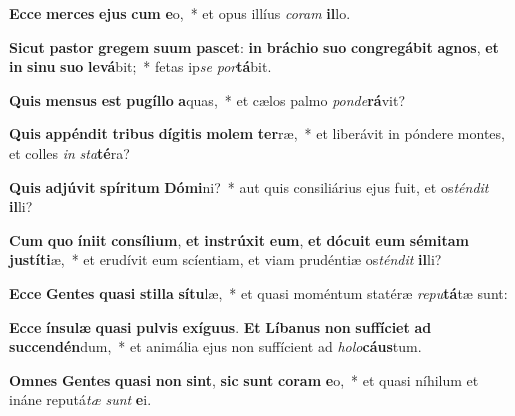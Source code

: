 \item \textbf{Ec}\textbf{ce} \textbf{mer}\textbf{ces} \textbf{e}\textbf{jus} \textbf{cum} \textbf{e}o,~* et opus illíus \textit{co}\textit{ram} \textbf{il}lo.
\item \textbf{Sic}\textbf{ut} \textbf{pas}\textbf{tor} \textbf{gre}\textbf{gem} \textbf{su}\textbf{um} \textbf{pa}\textbf{scet}: \textbf{in} \textbf{brá}\textbf{chi}\textbf{o} \textbf{su}\textbf{o} \textbf{con}\textbf{gre}\textbf{gá}\textbf{bit} \textbf{a}\textbf{gnos}, \textbf{et} \textbf{in} \textbf{si}\textbf{nu} \textbf{su}\textbf{o} \textbf{le}\textbf{vá}bit;~* fetas ip\textit{se} \textit{por}\textbf{tá}bit.
\item \textbf{Quis} \textbf{men}\textbf{sus} \textbf{est} \textbf{pu}\textbf{gíl}\textbf{lo} \textbf{a}quas,~* et cælos palmo \textit{pon}\textit{de}\textbf{rá}vit?
\item \textbf{Quis} \textbf{ap}\textbf{pén}\textbf{dit} \textbf{tri}\textbf{bus} \textbf{dí}\textbf{gi}\textbf{tis} \textbf{mo}\textbf{lem} \textbf{ter}ræ,~* et liberávit in póndere montes, et colles \textit{in} \textit{sta}\textbf{té}ra?
\item \textbf{Quis} \textbf{ad}\textbf{jú}\textbf{vit} \textbf{spí}\textbf{ri}\textbf{tum} \textbf{Dó}\textbf{mi}ni?~* aut quis consiliárius ejus fuit, et os\textit{tén}\textit{dit} \textbf{il}li?
\item \textbf{Cum} \textbf{quo} \textbf{ín}\textbf{i}\textbf{it} \textbf{con}\textbf{sí}\textbf{li}\textbf{um}, \textbf{et} \textbf{in}\textbf{strú}\textbf{xit} \textbf{e}\textbf{um}, \textbf{et} \textbf{dó}\textbf{cu}\textbf{it} \textbf{e}\textbf{um} \textbf{sé}\textbf{mi}\textbf{tam} \textbf{jus}\textbf{tí}\textbf{ti}æ,~* et erudívit eum scíentiam, et viam prudéntiæ os\textit{tén}\textit{dit} \textbf{il}li?
\item \textbf{Ec}\textbf{ce} \textbf{Gen}\textbf{tes} \textbf{qua}\textbf{si} \textbf{stil}\textbf{la} \textbf{sí}\textbf{tu}læ,~* et quasi moméntum statéræ \textit{re}\textit{pu}\textbf{tá}tæ sunt:
\item \textbf{Ec}\textbf{ce} \textbf{ín}\textbf{su}\textbf{læ} \textbf{qua}\textbf{si} \textbf{pul}\textbf{vis} \textbf{ex}\textbf{í}\textbf{gu}\textbf{us}. \textbf{Et} \textbf{Lí}\textbf{ba}\textbf{nus} \textbf{non} \textbf{suf}\textbf{fí}\textbf{ci}\textbf{et} \textbf{ad} \textbf{suc}\textbf{cen}\textbf{dén}dum,~* et animália ejus non suffícient ad \textit{ho}\textit{lo}\textbf{cáus}tum.
\item \textbf{Om}\textbf{nes} \textbf{Gen}\textbf{tes} \textbf{qua}\textbf{si} \textbf{non} \textbf{sint}, \textbf{sic} \textbf{sunt} \textbf{co}\textbf{ram} \textbf{e}o,~* et quasi níhilum et ináne reputá\textit{tæ} \textit{sunt} \textbf{e}i.
